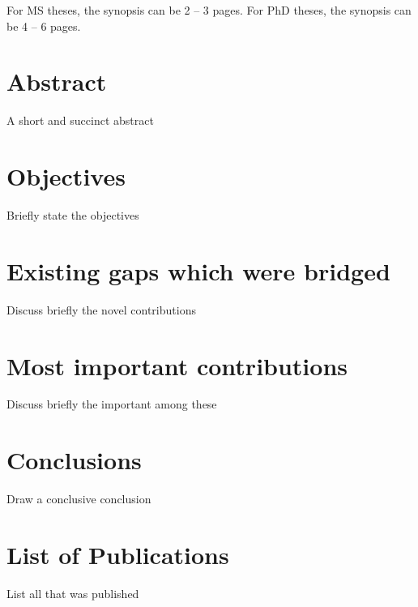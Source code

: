 \documentclass
    [phd,synopsis]
    {iitmdissertation}
\begin{document}
\prematter

For MS theses, the synopsis can be 2 -- 3 pages.
\newline 
For PhD theses, the synopsis can be 4 -- 6 pages.

\section{Abstract}
A short and succinct abstract

\section{Objectives}
Briefly state the objectives

\section{Existing gaps which were bridged}
Discuss briefly the novel contributions

\section{Most important contributions}
Discuss briefly the important among these

\section{Conclusions}
Draw a conclusive conclusion

\section{List of Publications}
List all that was published

\par
\begingroup
\footnotesize
{}
\endgroup
\end{document}
